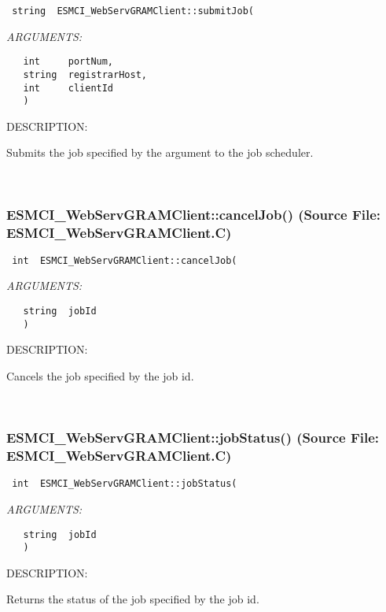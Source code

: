   
\begin{verbatim} string  ESMCI_WebServGRAMClient::submitJob(\end{verbatim}{\em ARGUMENTS:}
\begin{verbatim}   int     portNum,
   string  registrarHost,
   int     clientId
   )\end{verbatim}
{\sf DESCRIPTION:\\ }


      Submits the job specified by the argument to the job scheduler.
   
 
\mbox{}\hrulefill\
 
\subsubsection{ESMCI\_WebServGRAMClient::cancelJob() (Source File: ESMCI\_WebServGRAMClient.C)}


  
\begin{verbatim} int  ESMCI_WebServGRAMClient::cancelJob(\end{verbatim}{\em ARGUMENTS:}
\begin{verbatim}   string  jobId
   )\end{verbatim}
{\sf DESCRIPTION:\\ }


      Cancels the job specified by the job id.
   
 
\mbox{}\hrulefill\
 
\subsubsection{ESMCI\_WebServGRAMClient::jobStatus() (Source File: ESMCI\_WebServGRAMClient.C)}


  
\begin{verbatim} int  ESMCI_WebServGRAMClient::jobStatus(\end{verbatim}{\em ARGUMENTS:}
\begin{verbatim}   string  jobId
   )\end{verbatim}
{\sf DESCRIPTION:\\ }


      Returns the status of the job specified by the job id.
  
\setlength{\parskip}{\oldparskip}
\setlength{\parindent}{\oldparindent}
\setlength{\baselineskip}{\oldbaselineskip}
